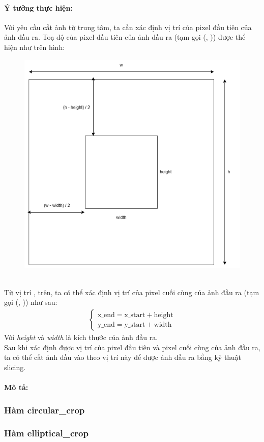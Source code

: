 \documentclass{article}
\begin{document}
\paragraph{Ý tưởng thực hiện:} Với yêu cầu cắt ảnh từ trung tâm, ta cần xác định vị trí của pixel đầu tiên của ảnh đầu ra. Toạ độ của pixel đầu tiên của ảnh đầu ra (tạm gọi (, )) được thể hiện như trên hình:
\begin{figure}[!ht]
\includegraphics[width = .5\textwidth]{image/square_center.png}
\end{figure} \\
Từ vị trí ,  trên, ta có thể xác định vị trí của pixel cuối cùng của ảnh đầu ra (tạm gọi (, )) như sau:
\begin{align*}
  \begin{cases}
    \text{x\_{end}} = \text{x\_{start}} + \text{height} \\
    \text{y\_{end}} = \text{y\_{start}} + \text{width}
  \end{cases}
\end{align*}
Với \textit{height} và \textit{width} là kích thước của ảnh đầu ra. \\
Sau khi xác định được vị trí của pixel đầu tiên và pixel cuối cùng của ảnh đầu ra, ta có thể cắt ảnh đầu vào theo vị trí này để được ảnh đầu ra bằng kỹ thuật slicing. 

\paragraph{Mô tả:}


\subsubsection{Hàm circular\_crop}
\subsubsection{Hàm elliptical\_crop}
\end{document}
